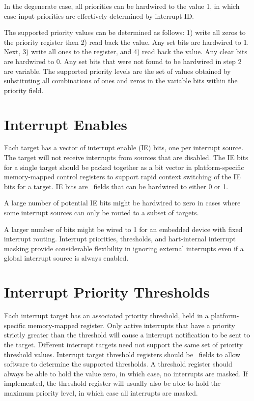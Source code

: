 \begin{commentary}
 In the degenerate case, all priorities can be hardwired to the value
 1, in which case input priorities are effectively determined by
 interrupt ID.

 The supported priority values can be determined as follows: 1) write
 all zeros to the priority register then 2) read back the value.  Any
 set bits are hardwired to 1.  Next, 3) write all ones to the
 register, and 4) read back the value.  Any clear bits are hardwired
 to 0.  Any set bits that were not found to be hardwired in step 2 are
 variable.  The supported priority levels are the set of values
 obtained by substituting all combinations of ones and zeros in the
 variable bits within the priority field.
\end{commentary}

\section{Interrupt Enables}

Each target has a vector of interrupt enable (IE) bits, one per
interrupt source.  The target will not receive interrupts from sources
that are disabled.  The IE bits for a single target should be packed
together as a bit vector in platform-specific memory-mapped control
registers to support rapid context switching of the IE bits for a
target.  IE bits are \warl\ fields that can be hardwired to either 0
or 1.

\begin{commentary}
A large number of potential IE bits might be hardwired to zero in
cases where some interrupt sources can only be routed to
a subset of targets.

A larger number of bits might be wired to 1 for an embedded device
with fixed interrupt routing.  Interrupt priorities, thresholds, and
hart-internal interrupt masking provide considerable flexibility in
ignoring external interrupts even if a global interrupt source is
always enabled.
\end{commentary}

\section{Interrupt Priority Thresholds}

Each interrupt target has an associated priority threshold, held in a
platform-specific memory-mapped register.  Only active interrupts that
have a priority strictly greater than the threshold will cause a
interrupt notification to be sent to the target.  Different interrupt
targets need not support the same set of priority threshold values.
Interrupt target threshold registers should be \warl\ fields to allow
software to determine the supported thresholds.  A threshold register
should always be able to hold the value zero, in which case, no
interrupts are masked.  If implemented, the threshold register will
usually also be able to hold the maximum priority level, in which case
all interrupts are masked.


